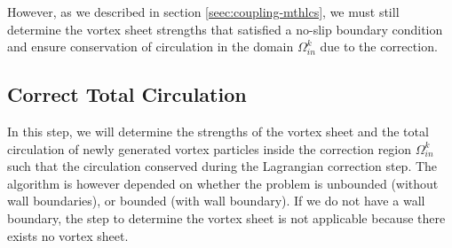 	However, as we described in section \ref{seec:coupling-mthlcs}, we must still determine the vortex sheet strengths that satisfied a no-slip boundary condition and ensure conservation of circulation in the domain $\Omega_{in}^k$ due to the correction.

		
		
			
	
	\subsection{Correct Total Circulation}
	
	In this step, we will determine the strengths of the vortex sheet and the total circulation of newly generated vortex particles inside the correction region $\Omega_{in}^k$ such that the circulation conserved during the Lagrangian correction step. The algorithm is however depended on whether the problem is unbounded (without wall boundaries), or bounded (with wall boundary). If we do not have a wall boundary, the step to determine the vortex sheet is not applicable because there exists no vortex sheet.
	
